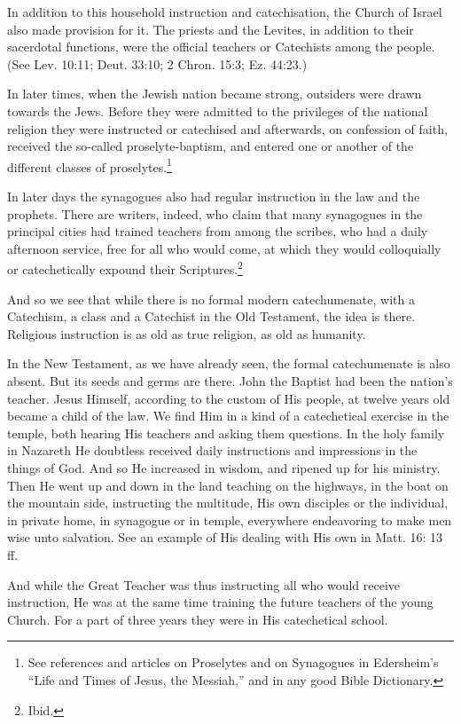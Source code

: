 In addition to this household instruction and catechisation, the Church of Israel also made provision for it. The priests and the Levites, in addition to their sacerdotal functions, were the official teachers or Catechists among the people. (See Lev. 10:11; Deut. 33:10; 2 Chron. 15:3; Ez. 44:23.)

In later times, when the Jewish nation became strong, outsiders were drawn towards the Jews. Before they were admitted to the privileges of the national religion they were instructed or catechised and afterwards, on confession of faith, received the so-called proselyte-baptism, and entered one or another of the different classes of proselytes.\footnote{See references and articles on Proselytes and on Synagogues in Edersheim’s “Life and Times of Jesus, the Messiah,” and in any good Bible Dictionary.}

In later days the synagogues also had regular instruction in the law and the prophets. There are writers, indeed, who claim that many synagogues in the principal cities had trained teachers from
among the scribes, who had a daily afternoon service, free for all who would come, at which they would colloquially or catechetically expound their Scriptures.\footnote{Ibid.}

And so we see that while there is no formal modern catechumenate, with a Catechism, a class and a Catechist in the Old Testament, the idea is there. Religious instruction is as old as true religion, as old as humanity.

In the New Testament, as we have already seen, the formal catechumenate is also absent. But its seeds and germs are there. John the Baptist had been the nation’s teacher. Jesus Himself, according to the custom of His people, at twelve years old became a child of the law. We find Him in a kind of a catechetical exercise in the temple, both hearing His teachers and asking them questions. In the holy family in Nazareth He doubtless received daily instructions and impressions in the things of God. And so He increased in wisdom, and ripened up for his ministry. Then He went up and down in the land teaching on the highways, in the boat on the mountain side, instructing the multitude, His own disciples or the individual, in private home, in synagogue or in temple, everywhere endeavoring to make men wise unto salvation. See an example of His dealing with His own in Matt. 16: 13 ff.

And while the Great Teacher was thus instructing all who would receive instruction, He was at the same time training the future teachers of the young Church. For a part of three years they were in His catechetical school.

